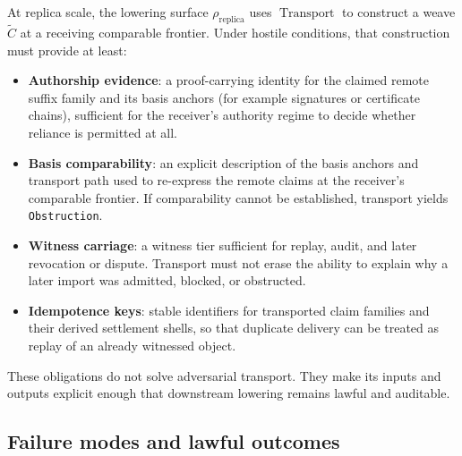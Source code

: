 \documentclass{aion}
\begin{document}
At replica scale, the lowering surface \(\rho_{\mathrm{replica}}\) uses
\(\operatorname{Transport}\) to construct a weave \(\widetilde{C}\) at a
receiving comparable frontier. Under hostile conditions, that construction must
provide at least:
\begin{itemize}[leftmargin=*]
	\item \textbf{Authorship evidence}: a proof-carrying identity for the claimed
	      remote suffix family and its basis anchors (for example signatures or
	      certificate chains), sufficient for the receiver's authority regime to
	      decide whether reliance is permitted at all.
	\item \textbf{Basis comparability}: an explicit description of the basis
	      anchors and transport path used to re-express the remote claims at the
	      receiver's comparable frontier. If comparability cannot be established,
	      transport yields \texttt{Obstruction}.
	\item \textbf{Witness carriage}: a witness tier sufficient for replay, audit,
	      and later revocation or dispute. Transport must not erase the ability to
	      explain why a later import was admitted, blocked, or obstructed.
	\item \textbf{Idempotence keys}: stable identifiers for transported claim
	      families and their derived settlement shells, so that duplicate delivery
	      can be treated as replay of an already witnessed object.
\end{itemize}

These obligations do not solve adversarial transport. They make its inputs and
outputs explicit enough that downstream lowering remains lawful and auditable.

\subsection{Failure modes and lawful outcomes}
\end{document}
